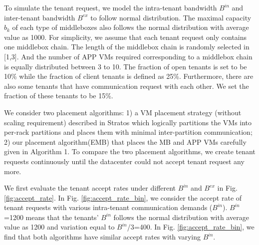 \documentclass[review]{elsarticle}
\begin{document}
To simulate the tenant request, we model the intra-tenant bandwidth $B^{in}$ and inter-tenant bandwidth $B^{ex}$ to follow normal distribution. The maximal capacity $b_k$ of each type of middleboxes also follows the normal distribution with average value as 1000. For simplicity, we assume that each tenant request only contains one middlebox chain. The length of the middlebox chain is randomly selected in [1,3]. And the number of APP VMs required corresponding to a middlebox chain is equally distributed between 3 to 10. The fraction of open tenants is set to be 10\% while the fraction of client tenants is defined as 25\%. Furthermore, there are also some tenants that have communication request with each other. We set the fraction of these tenants to be 15\%.  

We consider two placement algorithms: 1) a VM placement strategy (without scaling requirement) described in Stratos \cite{stratos12} which logically partitions the VMs into per-rack partitions and places them with minimal inter-partition communication; 2) our placement algorithm(EMB) that places the MB and APP VMs carefully given in Algorithm 1. To compare the two placement algorithms, we create tenant requests continuously until the datacenter could not accept tenant request any more.

We first evaluate the tenant accept rates under different $B^{in}$ and $B^{ex}$ in Fig. \ref{fig:accept_rate}.
In Fig. \ref{fig:accept_rate_bin}, we consider 
the accept rate of tenant requests with various intra-tenant communication demands ($B^{in}$). $B^{in}$=1200 means that the tenants’ $B^{in}$ follows the normal distribution with average value as 1200 and variation equal to $B^{in}$/3=400. In Fig. \ref{fig:accept_rate_bin}, we find that both algorithms have similar accept rates with varying $B^{in}$. 
\end{document}
